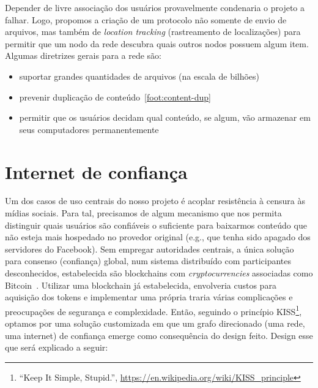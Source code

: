 Depender de livre associação dos usuários provavelmente condenaria o projeto a falhar.
Logo, propomos a criação de um protocolo não somente de envio de arquivos, mas também de \textit{location tracking} (rastreamento de localizações) para permitir que um nodo da rede descubra quais outros nodos possuem algum item.
Algumas diretrizes gerais para a rede são:
\begin{itemize}
    \item suportar grandes quantidades de arquivos (na escala de bilhões)
    \item prevenir duplicação de conteúdo~\ref{foot:content-dup}
    \item permitir que os usuários decidam qual conteúdo, se algum, vão armazenar em seus computadores permanentemente
\end{itemize}

\section{Internet de confiança}

Um dos casos de uso centrais do nosso projeto é acoplar resistência à censura às mídias sociais.
Para tal, precisamos de algum mecanismo que nos permita distinguir quais usuários são confiáveis o suficiente para baixarmos conteúdo que não esteja mais hospedado no provedor original (e.g., que tenha sido apagado dos servidores do Facebook).
Sem empregar autoridades centrais, a única solução para consenso (confiança) global, num sistema distribuído com participantes desconhecidos, estabelecida são blockchains com \textit{cryptocurrencies} associadas como Bitcoin~\cite{nakamoto2008bitcoin}.
Utilizar uma blockchain já estabelecida, envolveria custos para aquisição dos tokens e implementar uma própria traria várias complicações e preocupações de segurança e complexidade.
Então, seguindo o princípio KISS\footnote{``Keep It Simple, Stupid.'', \url{https://en.wikipedia.org/wiki/KISS_principle}}, optamos por uma solução customizada em que um grafo direcionado (uma rede, uma internet) de confiança emerge como consequência do design feito.
Design esse que será explicado a seguir:

